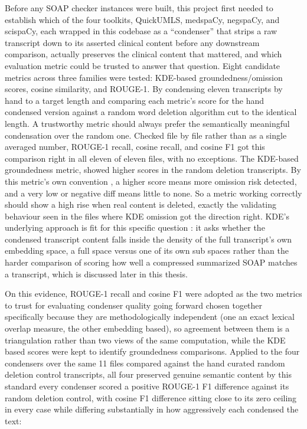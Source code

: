 \documentclass[11pt,a4paper]{article}
\begin{document}
Before any SOAP checker instances were built, this project first needed to establish which of the four toolkits,  QuickUMLS, medspaCy, negspaCy, and scispaCy, each wrapped in this codebase as a “condenser” that strips a raw transcript down to its asserted clinical content before any downstream comparison, actually preserves the clinical content that mattered, and which evaluation metric could be trusted to answer that question. 
Eight candidate metrics across three families were tested: KDE-based groundedness/omission scores, cosine similarity, and ROUGE-1.  By condensing eleven transcripts by hand to a target length and comparing each metric's score for the hand condensed version against a random word deletion algorithm cut to the identical length. A trustworthy metric should always prefer the semantically meaningful condensation over the random one. Checked file by file rather than as a single averaged number, ROUGE-1 recall, cosine recall, and cosine F1 got this comparison right in all eleven of eleven files, with no exceptions. 
The KDE-based groundedness metric, showed higher scores in the random deletion transcripts. By this metric's own convention \cite{oUKelmoun2025} , a higher score means more omission risk detected, and a very low or negative diff means little to none. So a metric working correctly should show a high rise when real content is deleted, exactly the validating behaviour seen in the files where KDE omission got the direction right. KDE's underlying approach is fit for this specific question : it asks whether the condensed transcript content falls inside the density of the full transcript's own embedding space, a full space versus one of its own sub spaces rather than the harder comparison of scoring how well a compressed summarized SOAP  matches a transcript,  which is discussed later
in this thesis.

On this evidence, ROUGE-1 recall and cosine F1 were adopted as the two metrics to trust for evaluating condenser quality going forward chosen together specifically because they are methodologically independent (one an exact lexical overlap measure, the other embedding based), so agreement between them is a triangulation rather than two views of the same computation, while the KDE based scores were kept to identify groundedness comparisons. Applied to the four  condensers over the same 11 files compared against the hand curated random deletion control transcripts, all four preserved genuine semantic content by this standard every condenser scored a positive ROUGE-1 F1 difference against its random deletion control, with cosine F1 difference sitting close to its zero ceiling in every case while differing substantially in how aggressively each condensed the text:
\end{document}
